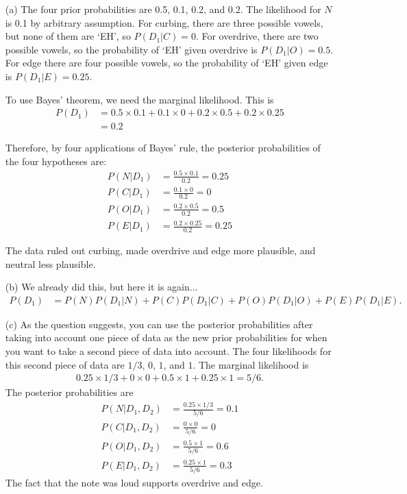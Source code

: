 \documentclass[a4paper, 12pt]{article}
\begin{document}
\begin{enumerate}
\item[(a)] The four prior probabilities are 0.5, 0.1, 0.2, and 0.2. The likelihood for $N$ is 0.1
by arbitrary assumption. For curbing, there are three possible vowels, but none of them are `EH',
so $P(D_1|C)=0$. For overdrive, there are two possible vowels, so the probability
of `EH' given overdrive
is $P(D_1|O)=0.5$. For edge there are four possible vowels, so the probability of
`EH' given edge is $P(D_1|E) = 0.25$.

To use Bayes' theorem, we need the marginal likelihood.
This is
\begin{align}
P(D_1) &= 0.5 \times 0.1 + 0.1 \times 0 + 0.2 \times 0.5 + 0.2 \times 0.25 \\
       &= 0.2
\end{align}

Therefore, by four applications of Bayes' rule, the posterior probabilities
of the four hypotheses are:
\begin{align}
P(N|D_1) &= \frac{0.5 \times 0.1}{0.2} = 0.25\\
P(C|D_1) &= \frac{0.1 \times 0}{0.2} = 0\\
P(O|D_1) &= \frac{0.2 \times 0.5}{0.2} = 0.5\\
P(E|D_1) &= \frac{0.2 \times 0.25}{0.2} = 0.25
\end{align}

The data ruled out curbing, made overdrive and edge more plausible, and neutral
less plausible.

\item[(b)] We already did this, but here it is again...
\begin{align*}
P(D_1) &= P(N)P(D_1|N)+P(C)P(D_1|C)+P(O)P(D_1|O)+P(E)P(D_1|E).
\end{align*}

\item[(c)] As the question suggests, you can use the posterior probabilities
after taking into account one piece of data as the new prior probabilities
for when you want to take a second piece of data into account.
The four likelihoods for this second piece of data are
$1/3$, $0$, $1$, and $1$. The marginal likelihood is
\begin{align}
0.25 \times 1/3 + 0 \times 0 + 0.5 \times 1 + 0.25 \times 1 = 5/6.
\end{align}
The posterior probabilities are
\begin{align}
P(N|D_1, D_2) &= \frac{0.25 \times 1/3}{5/6} = 0.1\\
P(C|D_1, D_2) &= \frac{0 \times 0}{5/6}      = 0\\
P(O|D_1, D_2) &= \frac{0.5 \times 1}{5/6}    = 0.6\\ 
P(E|D_1, D_2) &= \frac{0.25 \times 1}{5/6}   = 0.3
\end{align}
The fact that the note was loud supports overdrive and edge.


\end{enumerate}
\end{document}

